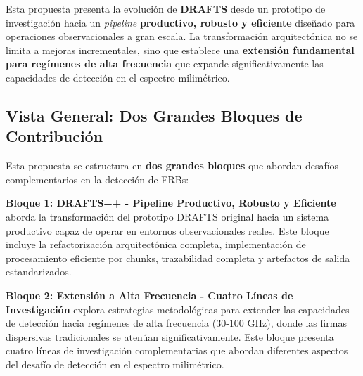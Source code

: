 


Esta propuesta presenta la evolución de \textbf{DRAFTS} \cite{zhang2024drafts} desde un prototipo de investigación hacia un \textit{pipeline} \textbf{productivo, robusto y eficiente} diseñado para operaciones observacionales a gran escala. La transformación arquitectónica no se limita a mejoras incrementales, sino que establece una \textbf{extensión fundamental para regímenes de alta frecuencia} que expande significativamente las capacidades de detección en el espectro milimétrico.

\subsection{Vista General: Dos Grandes Bloques de Contribución}

Esta propuesta se estructura en \textbf{dos grandes bloques} que abordan desafíos complementarios en la detección de FRBs:

\textbf{Bloque 1: DRAFTS++ - Pipeline Productivo, Robusto y Eficiente} aborda la transformación del prototipo DRAFTS original hacia un sistema productivo capaz de operar en entornos observacionales reales. Este bloque incluye la refactorización arquitectónica completa, implementación de procesamiento eficiente por chunks, trazabilidad completa y artefactos de salida estandarizados.

\textbf{Bloque 2: Extensión a Alta Frecuencia - Cuatro Líneas de Investigación} explora estrategias metodológicas para extender las capacidades de detección hacia regímenes de alta frecuencia (30-100 GHz), donde las firmas dispersivas tradicionales se atenúan significativamente. Este bloque presenta cuatro líneas de investigación complementarias que abordan diferentes aspectos del desafío de detección en el espectro milimétrico.

